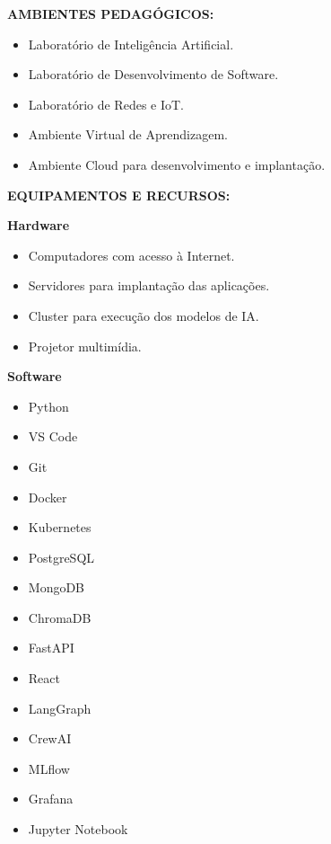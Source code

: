 \textbf{AMBIENTES PEDAGÓGICOS:}

\begin{itemize}
\item Laboratório de Inteligência Artificial.
\item Laboratório de Desenvolvimento de Software.
\item Laboratório de Redes e IoT.
\item Ambiente Virtual de Aprendizagem.
\item Ambiente Cloud para desenvolvimento e implantação.
\end{itemize}

\textbf{EQUIPAMENTOS E RECURSOS:}

\textbf{Hardware}

\begin{itemize}
\item Computadores com acesso à Internet.
\item Servidores para implantação das aplicações.
\item Cluster para execução dos modelos de IA.
\item Projetor multimídia.
\end{itemize}

\textbf{Software}

\begin{itemize}
\item Python
\item VS Code
\item Git
\item Docker
\item Kubernetes
\item PostgreSQL
\item MongoDB
\item ChromaDB
\item FastAPI
\item React
\item LangGraph
\item CrewAI
\item MLflow
\item Grafana
\item Jupyter Notebook
\end{itemize}
